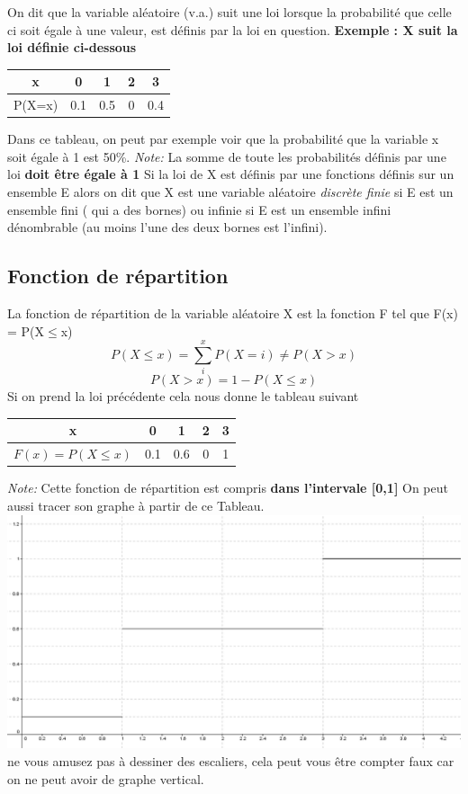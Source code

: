 \documentclass[a4paper]{article}
\begin{document}
{\raggedright On dit que la variable aléatoire (v.a.) suit une loi lorsque la probabilité que celle ci soit égale à une valeur, est définis par la loi en question.\newline
\textbf{Exemple : X suit la loi définie ci-dessous}\par}
{\centering
\begin{tabular}{|c|c|c|c|c|}
\hline
x & 0 & 1 & 2 & 3 \\
\hline
P(X=x) & 0.1 & 0.5 & 0 & 0.4 \\
\hline
\end{tabular}
\par}
Dans ce tableau, on peut par exemple voir que la probabilité que la variable x soit égale à 1 est 50\%. 
\textit{Note:} La somme de toute les probabilités définis par une loi \textbf{ doit être égale à 1}
\newline
Si la loi de X est définis par une fonctions définis sur un ensemble E alors on dit que X est une variable aléatoire \emph{discrète finie} si E est un ensemble fini ( qui a des bornes) ou infinie si E est un ensemble infini dénombrable (au moins l'une des deux bornes est l'infini).
\subsection{Fonction de répartition}

La fonction de répartition de la variable aléatoire X est la fonction F tel que F(x) = P(X$\leq$x)
$$ P(X\leq x)= \sum_i^x P(X=i) \neq P(X>x)$$ 
$$P(X>x) = 1 - P(X\leq x)$$
Si on prend la loi précédente cela nous donne le tableau suivant
{\centering
\begin{tabular}{|c|c|c|c|c|}
\hline
x & 0 & 1 & 2 & 3 \\
\hline
$ F(x) = P(X \leq x) $ & 0.1 & 0.6 & 0 & 1 \\
\hline
\end{tabular}
\par}
\textit{Note:} Cette fonction de répartition est compris \textbf{dans l'intervale [0,1]}
\newline On peut aussi tracer son graphe à partir de ce Tableau.
\newline
\includegraphics[scale=0.5]{Graph1.png}
\newline
ne vous amusez pas à dessiner des escaliers, cela peut vous être compter faux car on ne peut avoir de graphe vertical.
\end{document}
